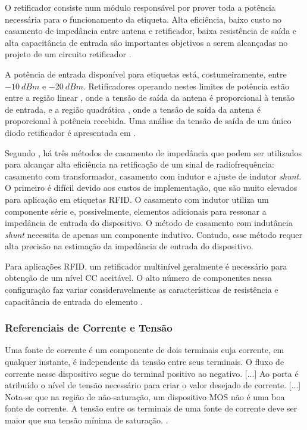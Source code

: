 O retificador consiste num módulo responsável por prover toda a potência necessária para o funcionamento da etiqueta. Alta eficiência, baixo custo no casamento de impedância entre antena e retificador, baixa resistência de saída e alta capacitância de entrada são importantes objetivos a serem alcançadas no projeto de um circuito retificador \cite{BARNETT:2006}.

A potência de entrada disponível para etiquetas está, costumeiramente, entre $-10~dBm$ e $-20~dBm$. Retificadores operando nestes limites de potência estão entre a região linear \cite{DICKSON:1976}, onde a tensão de saída da antena é proporcional à tensão de entrada, e a região quadrática \cite{AGILENT:1999}, onde a tensão de saída da antena é proporcional à potência recebida. Uma análise da tensão de saída de um único diodo retificador é apresentada em .

Segundo , há três métodos de casamento de impedância que podem ser utilizados para alcançar alta eficiência na retificação de um sinal de radiofrequência: casamento com transformador, casamento com indutor e ajuste de indutor \textit{shunt}. O primeiro é difícil devido aos custos de implementação, que são muito elevados para aplicação em etiquetas RFID. O casamento com indutor utiliza um componente série e, possivelmente, elementos adicionais para ressonar a impedância de entrada do dispositivo. O método de casamento com indutância \textit{shunt} necessita de apenas um componente indutivo. Contudo, esse método requer alta precisão na estimação da impedância de entrada do dispositivo.

Para aplicações {RFID}, um retificador multinível geralmente é necessário para obtenção de um nível {CC} aceitável. O alto número de componentes nessa configuração faz variar consideravelmente as características de resistência e capacitância de entrada do elemento \cite{BARNETT:2006}.


\subsubsection{Referenciais de Corrente e Tensão}
\begin{citacao}
	Uma fonte de corrente é um componente de dois terminais cuja corrente, em qualquer instante, é independente da tensão entre seus terminais. O fluxo de corrente nesse dispositivo segue do terminal positivo ao negativo. [...] Ao porta é atribuído o nível de tensão necessário para criar o valor desejado de corrente. [...] Nota-se que na região de não-saturação, um dispositivo MOS não é uma boa fonte de corrente. A tensão entre os terminais de uma fonte de corrente deve ser maior que sua tensão mínima de saturação. \cite{ALLEN:2002}.
\end{citacao}

